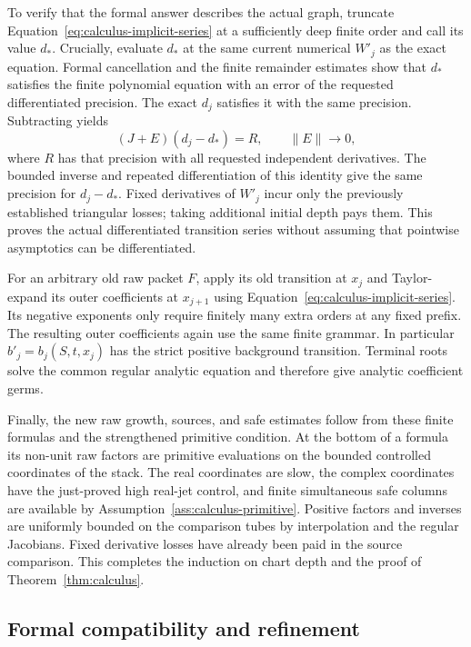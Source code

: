 To verify that the formal answer describes the actual graph, truncate
Equation~\eqref{eq:calculus-implicit-series} at a sufficiently deep finite
order and call its value $d_*$.  Crucially, evaluate $d_*$ at the same
current numerical $W'_j$ as the exact equation.  Formal cancellation and
the finite remainder estimates show that $d_*$ satisfies the finite
polynomial equation with an error of the requested differentiated
precision.  The exact $d_j$ satisfies it with the same precision.
Subtracting yields
\[
 (J+E)(d_j-d_*)=R,\qquad
 \|E\|\longrightarrow0,
\]
where $R$ has that precision with all requested independent derivatives.
The bounded inverse and repeated differentiation of this identity give
the same precision for $d_j-d_*$.  Fixed derivatives of $W'_j$ incur only
the previously established triangular losses; taking additional initial
depth pays them.  This proves the actual differentiated transition
series without assuming that pointwise asymptotics can be differentiated.

For an arbitrary old raw packet $F$, apply its old transition at $x_j$
and Taylor-expand its outer coefficients at $x_{j+1}$ using
Equation~\eqref{eq:calculus-implicit-series}.  Its negative exponents only
require finitely many extra orders at any fixed prefix.  The resulting
outer coefficients again use the same finite grammar.  In particular
$b'_j=b_j(S,t,x_j)$ has the strict positive background transition.
Terminal roots solve the common regular analytic equation and therefore
give analytic coefficient germs.

Finally, the new raw growth, sources, and safe estimates follow from
these finite formulas and the strengthened primitive condition.  At the
bottom of a formula its non-unit raw factors are primitive evaluations
on the bounded controlled coordinates of the stack.  The real coordinates
are slow, the complex coordinates have the just-proved high real-jet
control, and finite simultaneous safe columns are available by
Assumption~\ref{ass:calculus-primitive}.  Positive factors and inverses
are uniformly bounded on the comparison tubes by interpolation and the
regular Jacobians.  Fixed derivative losses have already been paid in
the source comparison.  This completes the induction on chart depth and
the proof of Theorem~\ref{thm:calculus}.

\subsection{Formal compatibility and refinement}

